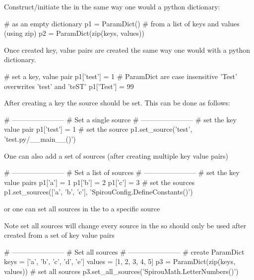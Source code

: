 \noindent Construct/initiate the \ParamDict in the same way one would a python dictionary:
\begin{pythonbox}
# as an empty dictionary
p1 = ParamDict()
# from a list of keys and values (using zip)
p2 = ParamDict(zip(keys, values))
\end{pythonbox}

\newpage

\noindent Once created key, value pairs are created the same way one would with a python dictionary.
\begin{pythonbox}
# set a key, value pair
p1['test'] = 1
# ParamDict are case insensitive 'Test' overwrites 'test' and 'teST' 
p1['Test'] = 99
\end{pythonbox}

\vspace{0.5cm}
\noindent After creating a key the source should be set. This can be done as follows:
\begin{pythonbox}
# -----------------------
# Set a single source
# -----------------------
# set the key value pair
p1['test'] = 1
# set the source
p1.set_source('test', 'test.py/__main__()')
\end{pythonbox}

\noindent One can also add a set of sources (after creating multiple key value pairs)
\begin{pythonbox}
# -----------------------
# Set a list of sources
# -----------------------
# set the key value pairs
p1['a'] = 1
p1['b'] = 2
p1['c'] = 3
# set the sources
p1.set_sources(['a', 'b', 'c'], 'SpirouConfig.DefineConstants()')
\end{pythonbox}

\vspace{0.5cm}
\noindent or one can set all sources in the \ParamDict to a specific source
\begin{note}
Note set all sources will change every source in the \ParamDict so should only be used after \ParamDict created from a set of key value pairs
\end{note}

\begin{pythonbox}
# -----------------------
# Set all sources
# -----------------------
# create ParamDict
keys = ['a', 'b', 'c', 'd', 'e']
values = [1, 2, 3, 4, 5]
p3 = ParamDict(zip(keys, values))
# set all sources
p3.set_all_sources('SpirouMath.LetterNumbers()')
\end{pythonbox}


\clearpage
\newpage
